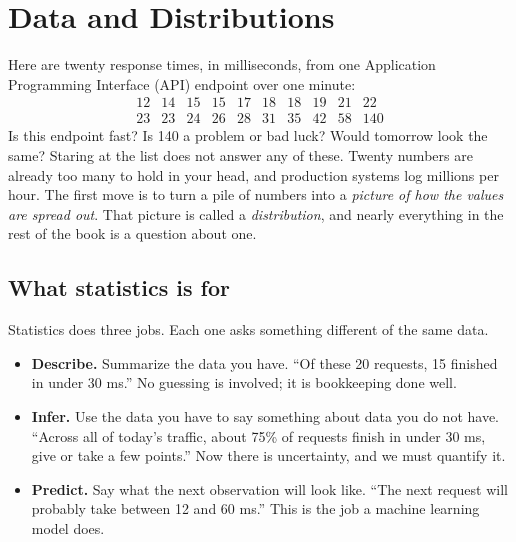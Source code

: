 \chapter{Data and Distributions}
\label{ch:data-distributions}

Here are twenty response times, in milliseconds, from one Application Programming Interface (API) endpoint over one minute:
\[
\begin{array}{cccccccccc}
12 & 14 & 15 & 15 & 17 & 18 & 18 & 19 & 21 & 22\\
23 & 23 & 24 & 26 & 28 & 31 & 35 & 42 & 58 & 140
\end{array}
\]
Is this endpoint fast? Is 140 a problem or bad luck? Would tomorrow look the same?
Staring at the list does not answer any of these. Twenty numbers are already too many to hold
in your head, and production systems log millions per hour. The first
move is to turn a pile of numbers into a \emph{picture of how the values are
spread out}. That picture is called a \emph{distribution}, and nearly everything in the rest of
the book is a question about one.

\section{What statistics is for}
\label{sec:data-what}

Statistics does three jobs. Each one asks something different of the same data.

\begin{itemize}
  \item \textbf{Describe.} Summarize the data you have. ``Of these 20 requests, 15 finished in
  under 30 ms.'' No guessing is involved; it is bookkeeping done well.
  \item \textbf{Infer.} Use the data you have to say something about data you do not have.
  ``Across all of today's traffic, about 75\% of requests finish in under 30 ms, give or take
  a few points.'' Now there is uncertainty, and we must quantify it.
  \item \textbf{Predict.} Say what the next observation will look like. ``The next request will
  probably take between 12 and 60 ms.'' This is the job a machine learning model does.
\end{itemize}

